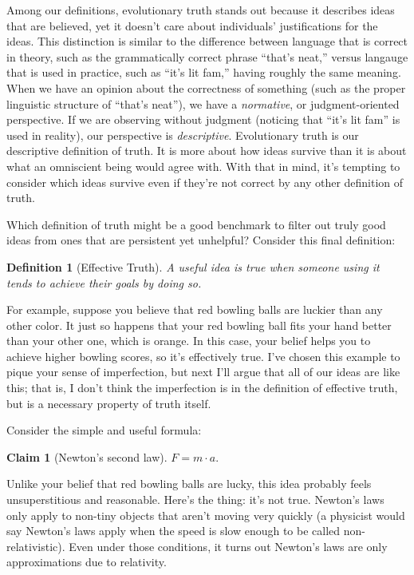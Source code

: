 \documentclass[11pt, oneside]{article}
\newtheorem*{defn}{Definition}
\newtheorem*{claim}{Claim}
\begin{document}
Among our definitions, evolutionary truth stands out because it describes
ideas that are believed, yet it doesn't
care about individuals' justifications for the ideas.
This distinction is similar to the difference
between language that is correct in theory, such as the grammatically
correct phrase ``that's neat,'' versus
langauge that is used in practice, such as ``it's lit fam,'' having roughly the
same meaning.
When we have an opinion about the correctness of something (such as the
proper linguistic structure of ``that's
neat''), we have a {\em
normative}, or judgment-oriented perspective.
If we are observing
without judgment (noticing that ``it's lit fam'' is used in reality),
our perspective is {\em descriptive}.
Evolutionary truth is our descriptive definition of truth.
It is more about how ideas survive than it is about what an omniscient being
would agree with.
With that in mind, it's tempting to consider which ideas survive even
if they're not correct by any other definition of truth.

Which definition of truth might be a good benchmark to filter out truly
good ideas from ones that are persistent yet unhelpful?
Consider this final definition:
\begin{defn}[Effective Truth]\label{d8}
    A useful idea is true when someone using it tends to achieve their goals by
    doing so.
\end{defn}

For example, suppose you believe that red bowling balls are luckier than any
other color. It just so happens that your red bowling ball fits your hand better
than your other one, which is orange.
In this case, your belief helps you to
achieve higher bowling scores, so it's effectively true.
I've chosen this example to pique your sense of imperfection, but next I'll
argue that all of our ideas are like this; that is, I don't think the
imperfection is in the definition of effective truth,
but is a necessary property of truth itself.

Consider the simple and useful formula:
\begin{claim}[Newton's second law]
    $F = m \cdot a.$
\end{claim}

Unlike your belief that red bowling balls are lucky, this idea probably feels
unsuperstitious and reasonable. Here's the thing: it's not true.
Newton's laws only apply to non-tiny
objects that aren't moving very quickly (a physicist would say Newton's laws
apply when the speed is slow enough to be called non-relativistic).
Even under those conditions,
it turns out Newton's laws are only approximations due
to relativity.
\end{document}
